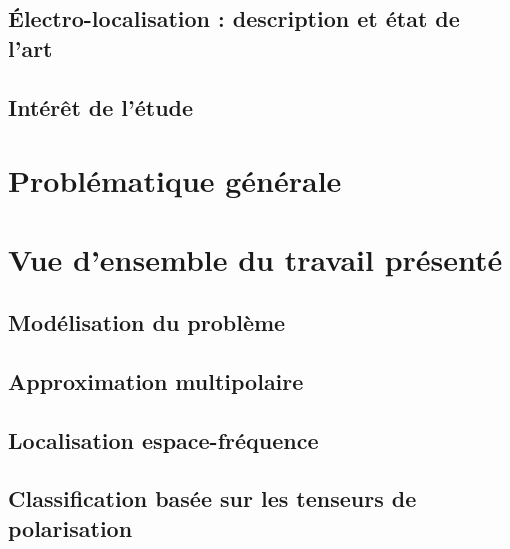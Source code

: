 \subsection{Électro-localisation : description et état de l'art}

\subsection{Intérêt de l'étude}

\section{Problématique générale}

\section{Vue d'ensemble du travail présenté}
\label{sec:resume-travail}
\subsection{Modélisation du problème}

\subsection{Approximation multipolaire}

\subsection{Localisation espace-fréquence}

\subsection{Classification basée sur les tenseurs de polarisation}